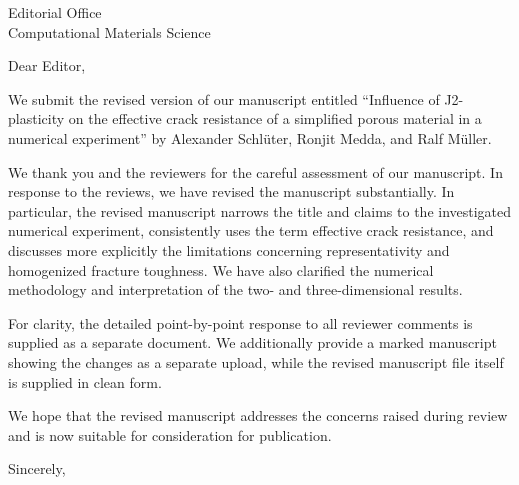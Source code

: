 \documentclass[11pt,a4paper]{letter}
\date{25 May 2026}
\begin{document}
\begin{letter}{Editorial Office\\Computational Materials Science}

\opening{Dear Editor,}

We submit the revised version of our manuscript entitled
``Influence of J2-plasticity on the effective crack resistance of a
simplified porous material in a numerical experiment'' by Alexander
Schl\"uter, Ronjit Medda, and Ralf M\"uller.

We thank you and the reviewers for the careful assessment of our
manuscript. In response to the reviews, we have revised the manuscript
substantially. In particular, the revised manuscript narrows the title
and claims to the investigated numerical experiment, consistently uses
the term effective crack resistance, and discusses more explicitly the
limitations concerning representativity and homogenized fracture
toughness. We have also clarified the numerical methodology and
interpretation of the two- and three-dimensional results.

For clarity, the detailed point-by-point response to all reviewer
comments is supplied as a separate document. We additionally provide a
marked manuscript showing the changes as a separate upload, while the
revised manuscript file itself is supplied in clean form.

We hope that the revised manuscript addresses the concerns raised during
review and is now suitable for consideration for publication.

\closing{Sincerely,}

\end{letter}
\end{document}
